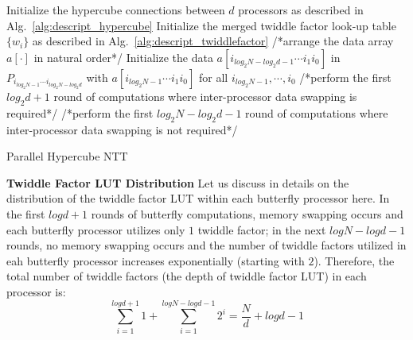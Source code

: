 \documentclass{iacrtrans}
\theoremstyle{plain}
\begin{document}
\begin{algorithm}[!tbh]
 \DontPrintSemicolon %
    Initialize the hypercube connections between $d$ processors as described in Alg.~\ref{alg:descript_hypercube}\;
    Initialize the merged twiddle factor look-up table $\{w_i\}$ as described in Alg.~\ref{alg:descript_twiddlefactor}\;
    /*arrange the data array $a[\cdot]$ in natural order*/\;
    Initialize the data $a[i_{log_2N-log_2d-1}\cdots i_1i_0]$ in $P_{i_{log_2N-1}\cdots i_{log_2N-log_2d}}$ with $a[i_{log_2N-1}\cdots i_1i_0]$ for all $i_{log_2N-1},\cdots,i_0$\;
    /*perform the first $log_2d+1$ round of computations where inter-processor data swapping is required*/\;
    /*perform the first $log_2N-log_2d-1$ round of computations where inter-processor data swapping is not required*/\;
 \caption{Parallel Hypercube NTT}\label{alg:descript_hypercube_ntt}
\end{algorithm}

\textbf{Twiddle Factor LUT Distribution} Let us discuss in details on the distribution of the twiddle factor LUT within each butterfly processor here. In the first $log d+1$ rounds of butterfly computations, memory swapping occurs and each butterfly processor utilizes only $1$ twiddle factor; in the next $logN-logd-1$ rounds, no memory swapping occurs and the number of twiddle factors utilized in eah butterfly processor increases exponentially (starting with $2$). Therefore, the total number of twiddle factors (the depth of twiddle factor LUT) in each processor is:
\[
    \sum_{i=1}^{logd+1}1 + \sum_{i=1}^{logN-logd-1}2^i=\frac{N}{d}+logd-1
\]
\end{document}
